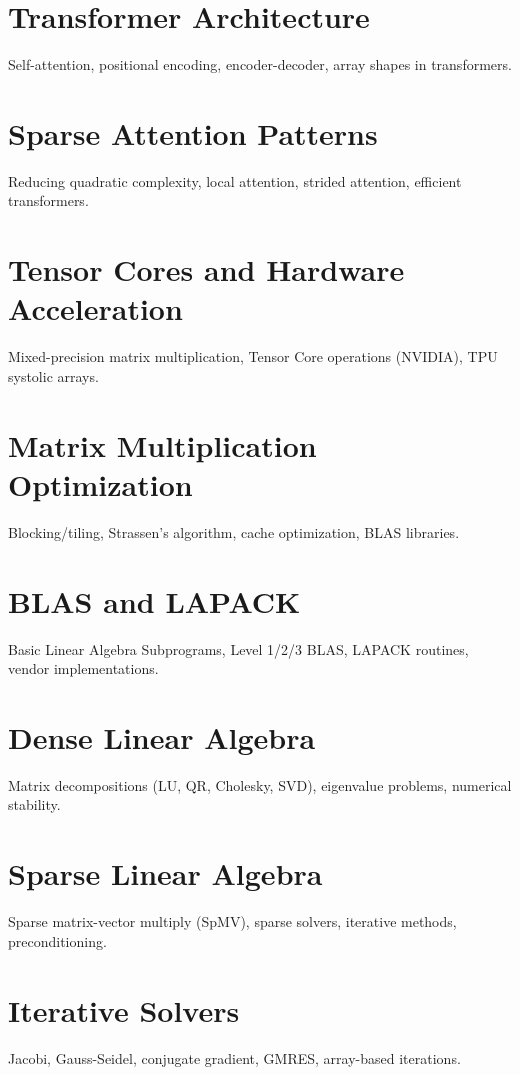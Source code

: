 \chapter{Transformer Architecture}
Self-attention, positional encoding, encoder-decoder, array shapes in transformers.

\chapter{Sparse Attention Patterns}
Reducing quadratic complexity, local attention, strided attention, efficient transformers.

\chapter{Tensor Cores and Hardware Acceleration}
Mixed-precision matrix multiplication, Tensor Core operations (NVIDIA), TPU systolic arrays.


\chapter{Matrix Multiplication Optimization}
Blocking/tiling, Strassen's algorithm, cache optimization, BLAS libraries.

\chapter{BLAS and LAPACK}
Basic Linear Algebra Subprograms, Level 1/2/3 BLAS, LAPACK routines, vendor implementations.

\chapter{Dense Linear Algebra}
Matrix decompositions (LU, QR, Cholesky, SVD), eigenvalue problems, numerical stability.

\chapter{Sparse Linear Algebra}
Sparse matrix-vector multiply (SpMV), sparse solvers, iterative methods, preconditioning.

\chapter{Iterative Solvers}
Jacobi, Gauss-Seidel, conjugate gradient, GMRES, array-based iterations.

